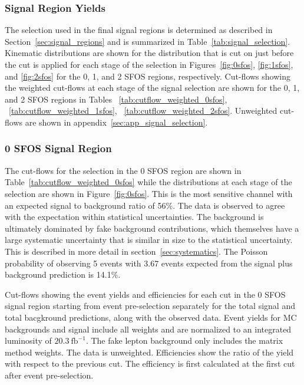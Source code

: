 \subsubsection{Signal Region Yields}
\label{sec:signal_yield}



The selection used in the final signal regions is determined as described in Section~\ref{sec:signal_regions} and is summarized in Table~\ref{tab:signal_selection}. Kinematic distributions are shown for the distribution
that is cut on just before the cut is applied
for each stage of the selection in Figures~\ref{fig:0sfos}, \ref{fig:1sfos}, and \ref{fig:2sfos} for
the 0, 1, and 2 SFOS regions, respectively.
Cut-flows showing the weighted cut-flows at each stage of the signal selection are shown for the 0, 1, and 2 SFOS regions
in Tables ~\ref{tab:cutflow_weighted_0sfos}, ~\ref{tab:cutflow_weighted_1sfos}, ~\ref{tab:cutflow_weighted_2sfos}.
Unweighted cut-flows are shown in appendix~\ref{sec:app_signal_selection}.





\subsubsection{0 SFOS Signal Region}

The cut-flows for the selection in the 0 SFOS region are shown in Table~\ref{tab:cutflow_weighted_0sfos}
while the distributions at each stage of the selection are shown in Figure~\ref{fig:0sfos}.
This is the most sensitive channel with an expected signal to background ratio of 56\%.
The data is observed to agree with the expectation within statistical uncertainties. The background
is ultimately dominated by fake background contributions, which themselves have a large systematic uncertainty
that is similar in size to the statistical uncertainty. This is described in more detail in section~\ref{sec:systematics}.
The Poisson probability of observing 5 events with 3.67 events expected from the signal plus background prediction is 14.1\%.


\begin{table}[ht!]
\centering
\small

\caption{Cut-flows showing the event yields and efficiencies for each cut in the 0 SFOS signal region
starting from event pre-selection separately for the total signal and total bacgkround predictions, along with the observed data. 
Event yields for MC backgrounds and signal include all weights and are normalized to an integrated luminosity of $20.3~\mathrm{fb}^{-1}$.  
The fake lepton background only includes the matrix method weights.  The data is unweighted.
Efficiencies show the ratio of the yield with respect
to the previous cut.  The efficiency is first calculated at the first cut after event pre-selection.  }
\label{tab:cutflow_weighted_0sfos}
\end{table}

